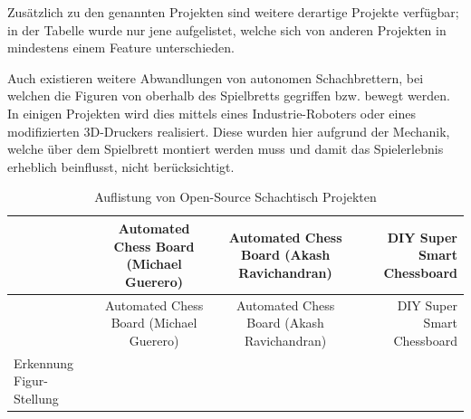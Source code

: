 Zusätzlich zu den genannten Projekten sind weitere derartige Projekte
verfügbar; in der Tabelle wurde nur jene aufgelistet, welche sich von
anderen Projekten in mindestens einem Feature unterschieden.

Auch existieren weitere Abwandlungen von autonomen Schachbrettern, bei
welchen die Figuren von oberhalb des Spielbretts gegriffen bzw. bewegt
werden. In einigen Projekten wird dies mittels eines Industrie-Roboters
\cite{actprojectrobot} oder eines modifizierten
3D-Druckers\cite{atcproject3dprinter} realisiert. Diese wurden hier
aufgrund der Mechanik, welche über dem Spielbrett montiert werden muss
und damit das Spielerlebnis erheblich beinflusst, nicht berücksichtigt.

\pagebreak

\begin{longtable}[]{@{}lccr@{}}
\caption{Auflistung von Open-Source Schachtisch Projekten
\label{oschesstables}}\tabularnewline
\toprule
\begin{minipage}[b]{0.19\columnwidth}\raggedright
\strut
\end{minipage} & \begin{minipage}[b]{0.25\columnwidth}\centering
Automated Chess Board (Michael Guerero)\strut
\end{minipage} & \begin{minipage}[b]{0.26\columnwidth}\centering
Automated Chess Board (Akash Ravichandran)\strut
\end{minipage} & \begin{minipage}[b]{0.19\columnwidth}\raggedleft
DIY Super Smart Chessboard\strut
\end{minipage}\tabularnewline
\midrule
\endfirsthead
\toprule
\begin{minipage}[b]{0.19\columnwidth}\raggedright
\strut
\end{minipage} & \begin{minipage}[b]{0.25\columnwidth}\centering
Automated Chess Board (Michael Guerero)\strut
\end{minipage} & \begin{minipage}[b]{0.26\columnwidth}\centering
Automated Chess Board (Akash Ravichandran)\strut
\end{minipage} & \begin{minipage}[b]{0.19\columnwidth}\raggedleft
DIY Super Smart Chessboard\strut
\end{minipage}\tabularnewline
\midrule
\endhead
\begin{minipage}[t]{0.19\columnwidth}\raggedright
Erkennung Figur-Stellung\strut

\end{minipage}
\end{longtable}
